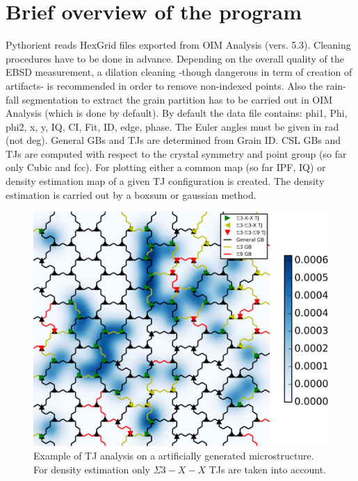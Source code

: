 \documentclass{article}
\begin{document}
\section{Brief overview of the program}
Pythorient reads HexGrid files exported from OIM Analysis (vers. 5.3). Cleaning procedures have to be done in advance. Depending on the overall quality of the EBSD measurement, a dilation cleaning -though dangerous in term of creation of artifacts- is recommended in order to remove non-indexed points. Also the rain-fall segmentation to extract the grain partition has to be carried out in OIM Analysis (which is done by default). By default the data file contains:   phi1, Phi, phi2, x, y, IQ, CI, Fit, ID, edge, phase. The Euler angles must be given in rad (not deg). General GBs and TJs are determined from Grain ID. CSL GBs and TJs are computed with respect to the crystal symmetry and point group (so far only Cubic and fcc). For plotting either a common map (so far IPF, IQ) or density estimation map of a given TJ configuration is created. The density estimation is carried out by a boxsum or gaussian method.
\begin{figure}[ht]
\centering
\includegraphics[width=\linewidth]{figs/Generated_OIM}
\caption{Example of TJ analysis on a artificially generated microstructure. For density estimation only $\Sigma3-X-X$ TJs are taken into account.}
\label{fig:generated}
\end{figure}
\end{document}
